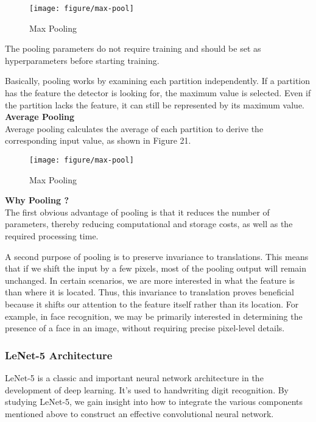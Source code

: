 \documentclass{article}
\begin{document}
\begin{figure}[htbp]
        \centering
        \texttt{[image: figure/max-pool]}
        \caption{Max Pooling}
     \end{figure}

The pooling parameters do not require training and should be set as hyperparameters before starting training.

Basically, pooling works by examining each partition independently. If a partition has the feature the detector is looking for, the maximum value is selected. Even if the partition lacks the feature, it can still be represented by its maximum value.\\


\noindent
\textbf{Average Pooling}\\
\noindent
Average pooling calculates the average of each partition to derive the corresponding input value, as shown in Figure 21.


\begin{figure}[htbp]
        \centering
        \texttt{[image: figure/max-pool]}
        \caption{Max Pooling}
     \end{figure}


\noindent
\textbf{Why Pooling ? }\\
\noindent
The first obvious advantage of pooling is that it reduces the number of parameters, thereby reducing computational and storage costs, as well as the required processing time.

A second purpose of pooling is to preserve invariance to translations. This means that if we shift the input by a few pixels, most of the pooling output will remain unchanged. In certain scenarios, we are more interested in what the feature is than where it is located. Thus, this invariance to translation proves beneficial because it shifts our attention to the feature itself rather than its location. For example, in face recognition, we may be primarily interested in determining the presence of a face in an image, without requiring precise pixel-level details.


\newpage
\subsubsection{LeNet-5 Architecture}

LeNet-5 is a classic and important neural network architecture in the development of deep learning. It’s used to handwriting digit recognition. By studying LeNet-5, we gain insight into how to integrate the various components mentioned above to construct an effective convolutional neural network.
\end{document}
